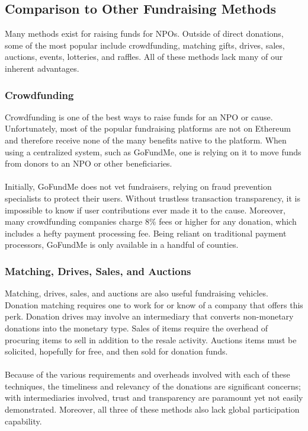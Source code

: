 \documentclass[11pt]{article}
\begin{document}
\subsection{Comparison to Other Fundraising Methods}

Many methods exist for raising funds for NPOs. Outside of direct donations, some of the most popular include crowdfunding, matching gifts, drives, sales, auctions, events, lotteries, and raffles. All of these methods lack many of our inherent advantages.

\subsubsection{Crowdfunding}

Crowdfunding is one of the best ways to raise funds for an NPO or cause. Unfortunately, most of the popular fundraising platforms are not on Ethereum and therefore receive none of the many benefits native to the platform. When using a centralized system, such as GoFundMe, one is relying on it to move funds from donors to an NPO or other beneficiaries.\\\\
Initially, GoFundMe does not vet fundraisers, relying on fraud prevention specialists to protect their users. Without trustless transaction transparency, it is impossible to know if user contributions ever made it to the cause. Moreover, many crowdfunding companies charge 8\% fees or higher for any donation, which includes a hefty payment processing fee. Being reliant on traditional payment processors, GoFundMe is only available in a handful of counties.

\subsubsection{Matching, Drives, Sales, and Auctions}

Matching, drives, sales, and auctions are also useful fundraising vehicles. Donation matching requires one to work for or know of a company that offers this perk. Donation drives may involve an intermediary that converts non-monetary donations into the monetary type. Sales of items require the overhead of procuring items to sell in addition to the resale activity. Auctions items must be solicited, hopefully for free, and then sold for donation funds.\\\\
Because of the various requirements and overheads involved with each of these techniques, the timeliness and relevancy of the donations are significant concerns; with intermediaries involved, trust and transparency are paramount yet not easily demonstrated. Moreover, all three of these methods also lack global participation capability.
\end{document}
